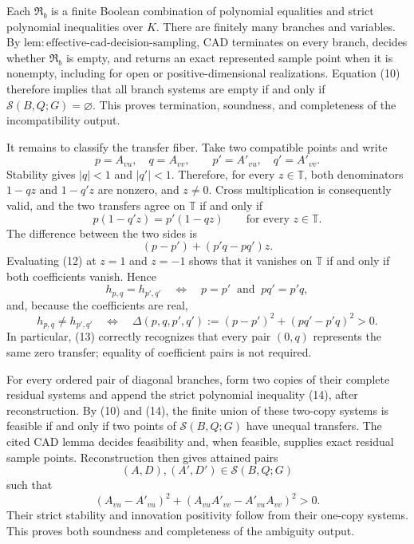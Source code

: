 Each \(\mathfrak R_b\) is a finite Boolean combination of polynomial equalities and strict polynomial inequalities over \(K\).  There are finitely many branches and variables.  By \(\mathrm{lem{:}effective\mbox{-}cad\mbox{-}decision\mbox{-}sampling}\), CAD terminates on every branch, decides whether \(\mathfrak R_b\) is empty, and returns an exact represented sample point when it is nonempty, including for open or positive-dimensional realizations.  Equation (10) therefore implies that all branch systems are empty if and only if \(\mathcal S(B,Q;G)=\varnothing\).  This proves termination, soundness, and completeness of the incompatibility output.

It remains to classify the transfer fiber.  Take two compatible points and write
\[
 p=A_{vu},\quad q=A_{vv},\qquad p'=A'_{vu},\quad q'=A'_{vv}.
\]
Stability gives \(|q|<1\) and \(|q'|<1\).  Therefore, for every \(z\in\mathbb T\), both denominators \(1-qz\) and \(1-q'z\) are nonzero, and \(z\ne0\).  Cross multiplication is consequently valid, and the two transfers agree on \(\mathbb T\) if and only if
\[
 p(1-q'z)=p'(1-qz)\qquad\text{for every }z\in\mathbb T.          \tag{11}
\]
The difference between the two sides is
\[
 (p-p')+(p'q-pq')z.                                               \tag{12}
\]
Evaluating (12) at \(z=1\) and \(z=-1\) shows that it vanishes on \(\mathbb T\) if and only if both coefficients vanish.  Hence
\[
 h_{p,q}=h_{p',q'}
 \quad\Longleftrightarrow\quad
 p=p'\ \text{ and }\ pq'=p'q,                                   \tag{13}
\]
and, because the coefficients are real,
\[
 h_{p,q}\ne h_{p',q'}
 \quad\Longleftrightarrow\quad
 \Delta(p,q,p',q')
 :=(p-p')^2+(pq'-p'q)^2>0.                                       \tag{14}
\]
In particular, (13) correctly recognizes that every pair \((0,q)\) represents the same zero transfer; equality of coefficient pairs is not required.

For every ordered pair of diagonal branches, form two copies of their complete residual systems and append the strict polynomial inequality (14), after reconstruction.  By (10) and (14), the finite union of these two-copy systems is feasible if and only if two points of \(\mathcal S(B,Q;G)\) have unequal transfers.  The cited CAD lemma decides feasibility and, when feasible, supplies exact residual sample points.  Reconstruction then gives attained pairs
\[
 (A,D),(A',D')\in\mathcal S(B,Q;G)
\]
such that
\[
 (A_{vu}-A'_{vu})^2
 +(A_{vu}A'_{vv}-A'_{vu}A_{vv})^2>0.
\]
Their strict stability and innovation positivity follow from their one-copy systems.  This proves both soundness and completeness of the ambiguity output.

